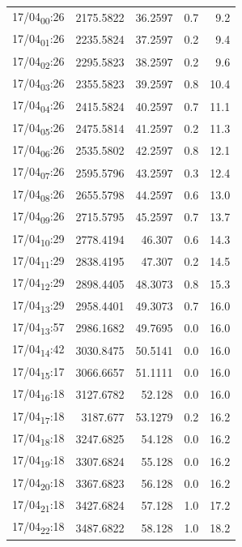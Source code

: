 \documentclass[11pt]{article}
\begin{document}
\begin{center}
\begin{tabular}{lrrrr}
17/04\textsubscript{00}:26 & 2175.5822 & 36.2597 & 0.7 & 9.2\\[0pt]
17/04\textsubscript{01}:26 & 2235.5824 & 37.2597 & 0.2 & 9.4\\[0pt]
17/04\textsubscript{02}:26 & 2295.5823 & 38.2597 & 0.2 & 9.6\\[0pt]
17/04\textsubscript{03}:26 & 2355.5823 & 39.2597 & 0.8 & 10.4\\[0pt]
17/04\textsubscript{04}:26 & 2415.5824 & 40.2597 & 0.7 & 11.1\\[0pt]
17/04\textsubscript{05}:26 & 2475.5814 & 41.2597 & 0.2 & 11.3\\[0pt]
17/04\textsubscript{06}:26 & 2535.5802 & 42.2597 & 0.8 & 12.1\\[0pt]
17/04\textsubscript{07}:26 & 2595.5796 & 43.2597 & 0.3 & 12.4\\[0pt]
17/04\textsubscript{08}:26 & 2655.5798 & 44.2597 & 0.6 & 13.0\\[0pt]
17/04\textsubscript{09}:26 & 2715.5795 & 45.2597 & 0.7 & 13.7\\[0pt]
17/04\textsubscript{10}:29 & 2778.4194 & 46.307 & 0.6 & 14.3\\[0pt]
17/04\textsubscript{11}:29 & 2838.4195 & 47.307 & 0.2 & 14.5\\[0pt]
17/04\textsubscript{12}:29 & 2898.4405 & 48.3073 & 0.8 & 15.3\\[0pt]
17/04\textsubscript{13}:29 & 2958.4401 & 49.3073 & 0.7 & 16.0\\[0pt]
17/04\textsubscript{13}:57 & 2986.1682 & 49.7695 & 0.0 & 16.0\\[0pt]
17/04\textsubscript{14}:42 & 3030.8475 & 50.5141 & 0.0 & 16.0\\[0pt]
17/04\textsubscript{15}:17 & 3066.6657 & 51.1111 & 0.0 & 16.0\\[0pt]
17/04\textsubscript{16}:18 & 3127.6782 & 52.128 & 0.0 & 16.0\\[0pt]
17/04\textsubscript{17}:18 & 3187.677 & 53.1279 & 0.2 & 16.2\\[0pt]
17/04\textsubscript{18}:18 & 3247.6825 & 54.128 & 0.0 & 16.2\\[0pt]
17/04\textsubscript{19}:18 & 3307.6824 & 55.128 & 0.0 & 16.2\\[0pt]
17/04\textsubscript{20}:18 & 3367.6823 & 56.128 & 0.0 & 16.2\\[0pt]
17/04\textsubscript{21}:18 & 3427.6824 & 57.128 & 1.0 & 17.2\\[0pt]
17/04\textsubscript{22}:18 & 3487.6822 & 58.128 & 1.0 & 18.2\\[0pt]

\end{tabular}
\end{center}
\end{document}
